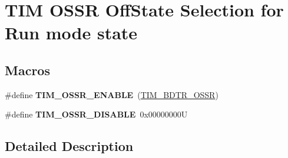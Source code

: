 \hypertarget{group___t_i_m___o_s_s_r___off___state___selection__for___run__mode__state}{}\section{T\+IM O\+S\+SR Off\+State Selection for Run mode state}
\label{group___t_i_m___o_s_s_r___off___state___selection__for___run__mode__state}
\subsection*{Macros}
\begin{DoxyCompactItemize}
\item 
\mbox{\label{group___t_i_m___o_s_s_r___off___state___selection__for___run__mode__state_ga5d21918f173eca946748a1fbc177daa5}} 
\#define {\bfseries T\+I\+M\+\_\+\+O\+S\+S\+R\+\_\+\+E\+N\+A\+B\+LE}~(\mbox{\hyperlink{group___peripheral___registers___bits___definition_gaf9435f36d53c6be1107e57ab6a82c16e}{T\+I\+M\+\_\+\+B\+D\+T\+R\+\_\+\+O\+S\+SR}})
\item 
\mbox{\label{group___t_i_m___o_s_s_r___off___state___selection__for___run__mode__state_gae11820b467ef6d74c90190c8cfce5e73}} 
\#define {\bfseries T\+I\+M\+\_\+\+O\+S\+S\+R\+\_\+\+D\+I\+S\+A\+B\+LE}~0x00000000U
\end{DoxyCompactItemize}


\subsection{Detailed Description}
